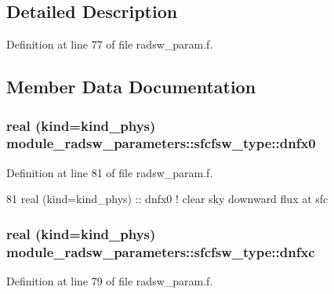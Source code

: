\subsection{Detailed Description}


Definition at line 77 of file radsw\+\_\+param.\+f.



\subsection{Member Data Documentation}
\subsubsection[{\texorpdfstring{dnfx0}{dnfx0}}]{\setlength{\rightskip}{0pt plus 5cm}real (kind=kind\+\_\+phys) module\+\_\+radsw\+\_\+parameters\+::sfcfsw\+\_\+type\+::dnfx0}\hypertarget{structmodule__radsw__parameters_1_1sfcfsw__type_a2b1a4d8e0e93332fd08f3aa6b68fb141}{}\label{structmodule__radsw__parameters_1_1sfcfsw__type_a2b1a4d8e0e93332fd08f3aa6b68fb141}


Definition at line 81 of file radsw\+\_\+param.\+f.


\begin{DoxyCode}
81         \textcolor{keywordtype}{real (kind=kind\_phys)} :: dnfx0         \textcolor{comment}{! clear sky downward flux at sfc}
\end{DoxyCode}
\subsubsection[{\texorpdfstring{dnfxc}{dnfxc}}]{\setlength{\rightskip}{0pt plus 5cm}real (kind=kind\+\_\+phys) module\+\_\+radsw\+\_\+parameters\+::sfcfsw\+\_\+type\+::dnfxc}\hypertarget{structmodule__radsw__parameters_1_1sfcfsw__type_a0e5e6bfe14ffd1a9c1c8abfc730db4ba}{}\label{structmodule__radsw__parameters_1_1sfcfsw__type_a0e5e6bfe14ffd1a9c1c8abfc730db4ba}


Definition at line 79 of file radsw\+\_\+param.\+f.


